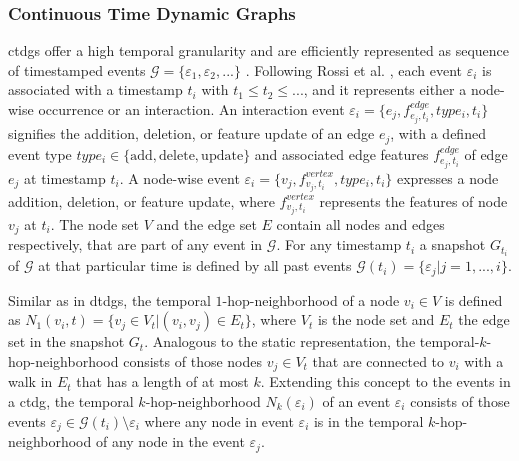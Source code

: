 \subsubsection{Continuous Time Dynamic Graphs}
\label{s_Background_Graphs_CTDGs}

\glspl{ctdg} offer a high temporal granularity \cite{trivedi_dyrep_2019} and are efficiently represented as sequence of timestamped events $\mathcal{G} = \{\varepsilon_{1}, \varepsilon_{2}, ...\}$ \cite{rossi_temporal_2020}. Following Rossi et al. \cite{rossi_temporal_2020}, each event $\varepsilon_{i}$ is associated with a timestamp $t_i$ with $t_1 \leq t_2 \leq ...$, and it represents either a node-wise occurrence or an interaction. An interaction event $\varepsilon_{i} = \{e_j, f^{edge}_{e_j, t_i}, type_{i}, t_i\}$ signifies the addition, deletion, or feature update of an edge $e_j$, with a defined event type $type_{i} \in \{\mathrm{add}, \mathrm{delete}, \mathrm{update}\}$ and associated edge features $f^{edge}_{e_j, t_i}$ of edge $e_j$ at timestamp $t_i$. A node-wise event $\varepsilon_{i} = \{v_j, f^{vertex}_{v_j, t_i}, type_{i}, t_i\}$ expresses a node addition, deletion, or feature update, where $f^{vertex}_{v_j, t_i}$ represents the features of node $v_j$ at $t_i$. The node set $V$ and the edge set $E$ contain all nodes and edges respectively, that are part of any event in $\mathcal{G}$. For any timestamp $t_i$ a snapshot $G_{t_i}$ of $\mathcal{G}$ at that particular time is defined by all past events $\mathcal{G}(t_i) = \{\varepsilon_{j} | j = 1,...,i\}$.

Similar as in \glspl{dtdg}, the temporal $1$-hop-neighborhood of a node $v_i \in V$ is defined as $N_1(v_i, t) = \{v_j \in V_t | (v_i, v_j) \in E_t\}$, where $V_t$ is the node set and $E_t$ the edge set in the snapshot $G_t$. Analogous to the static representation, the temporal-$k$-hop-neighborhood consists of those nodes $v_j \in V_t$ that are connected to $v_i$ with a walk in $E_t$ that has a length of at most $k$. Extending this concept to the events in a \gls{ctdg}, the temporal $k$-hop-neighborhood $N_k(\varepsilon_i)$ of an event $\varepsilon_{i}$ consists of those events $\varepsilon_{j} \in \mathcal{G}(t_i) \setminus \varepsilon_{i}$ where any node in event $\varepsilon_{i}$ is in the temporal $k$-hop-neighborhood of any node in the event $\varepsilon_{j}$.

